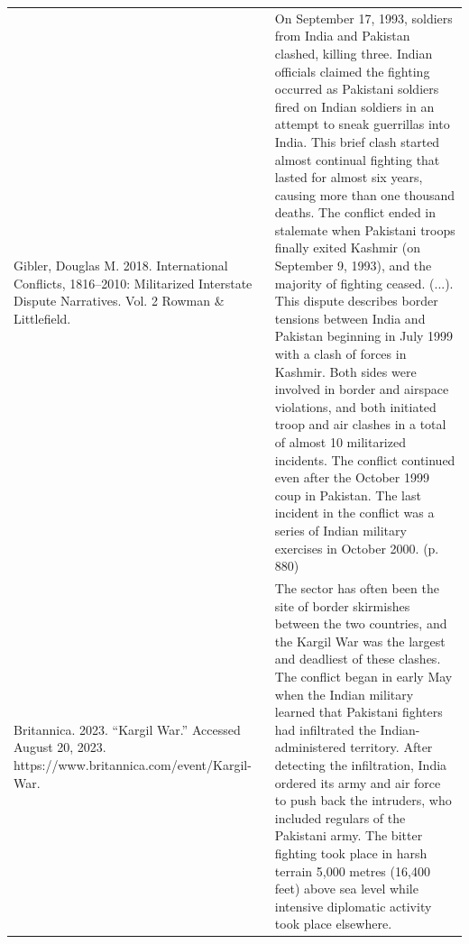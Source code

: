 {\begin{longtable}{p{}p{}}
Gibler, Douglas M. 2018. International Conflicts, 1816–2010: Militarized Interstate Dispute Narratives. Vol. 2 Rowman \& Littlefield. & On September 17, 1993, soldiers from India and Pakistan clashed, killing three. Indian officials claimed the fighting occurred as Pakistani soldiers fired on Indian soldiers in an attempt to sneak guerrillas into India. This brief clash started almost continual fighting that lasted for almost six years, causing more than one thousand deaths. The conflict ended in stalemate when Pakistani troops finally exited Kashmir (on September 9, 1993), and the majority of fighting ceased. (...).
This dispute describes border tensions between India and Pakistan beginning in July 1999 with a clash of forces in Kashmir. Both sides were involved in border and airspace violations, and both initiated troop and air clashes in a total of almost 10 militarized incidents. The conflict continued even after the October 1999 coup in Pakistan. The last incident in the conflict was a series of Indian military exercises in October 2000. (p. 880)
\\
Britannica. 2023. “Kargil War.” Accessed August 20, 2023. https://www.britannica.com/event/Kargil-War. & The sector has often been the site of border skirmishes between the two countries, and the Kargil War was the largest and deadliest of these clashes. The conflict began in early May when the Indian military learned that Pakistani fighters had infiltrated the Indian-administered territory. After detecting the infiltration, India ordered its army and air force to push back the intruders, who included regulars of the Pakistani army. The bitter fighting took place in harsh terrain 5,000 metres (16,400 feet) above sea level while intensive diplomatic activity took place elsewhere.
\\

\end{longtable}}

